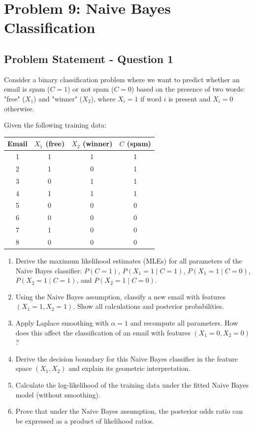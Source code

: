 \documentclass[12pt]{article}
\begin{document}
\newpage
\section{Problem 9: Naive Bayes Classification}

\subsection{Problem Statement - Question 1}

Consider a binary classification problem where we want to predict whether an email is spam ($C = 1$) or not spam ($C = 0$) based on the presence of two words: "free" ($X_1$) and "winner" ($X_2$), where $X_i = 1$ if word $i$ is present and $X_i = 0$ otherwise.

Given the following training data:

\begin{center}
\begin{tabular}{|c|c|c|c|}
\hline
\textbf{Email} & $X_1$ (free) & $X_2$ (winner) & $C$ (spam) \\
\hline
1 & 1 & 1 & 1 \\
2 & 1 & 0 & 1 \\
3 & 0 & 1 & 1 \\
4 & 1 & 1 & 1 \\
5 & 0 & 0 & 0 \\
6 & 0 & 0 & 0 \\
7 & 1 & 0 & 0 \\
8 & 0 & 0 & 0 \\
\hline
\end{tabular}
\end{center}

\begin{enumerate}[label=(\alph*)]
\item Derive the maximum likelihood estimates (MLEs) for all parameters of the Naive Bayes classifier: $P(C = 1)$, $P(X_1 = 1 \mid C = 1)$, $P(X_1 = 1 \mid C = 0)$, $P(X_2 = 1 \mid C = 1)$, and $P(X_2 = 1 \mid C = 0)$.

\item Using the Naive Bayes assumption, classify a new email with features $(X_1 = 1, X_2 = 1)$. Show all calculations and posterior probabilities.

\item Apply Laplace smoothing with $\alpha = 1$ and recompute all parameters. How does this affect the classification of an email with features $(X_1 = 0, X_2 = 0)$?

\item Derive the decision boundary for this Naive Bayes classifier in the feature space $(X_1, X_2)$ and explain its geometric interpretation.

\item Calculate the log-likelihood of the training data under the fitted Naive Bayes model (without smoothing).

\item Prove that under the Naive Bayes assumption, the posterior odds ratio can be expressed as a product of likelihood ratios.
\end{enumerate}
\end{document}
